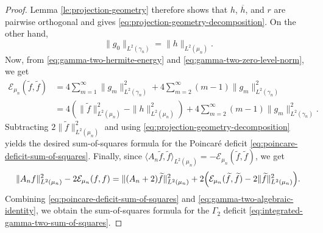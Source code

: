 \documentclass[11pt,reqno]{amsart}
\numberwithin{equation}{section}%
\numberwithin{figure}{section}%
\numberwithin{table}{section}
\theoremstyle{plain}
\theoremstyle{definition}
\begin{document}
\begin{proof}
  Lemma \ref{le:projection-geometry} therefore shows that $h$, $\overline h$,
  and $r$ are pairwise orthogonal and gives
  \eqref{eq:projection-geometry-decomposition}. On the other hand, 
  \begin{equation}\label{eq:gamma-two-zero-level-norm}
    \|g_0\|_{L^2(\gamma_n)}=\|h\|_{L^2(\mu_n)}.
  \end{equation}
  Now, from \eqref{eq:gamma-two-hermite-energy} and
  \eqref{eq:gamma-two-zero-level-norm}, we get
  \begin{align*}
    \mathcal{E}_{\mu_n}(\widetilde f,\widetilde f)
    &=4\sum_{m=1}^{\infty}\|g_m\|_{L^2(\gamma_n)}^2
      +4\sum_{m=2}^{\infty}(m-1)\|g_m\|_{L^2(\gamma_n)}^2\\
    &=4\left(
      \|\widetilde f\|_{L^2(\mu_n)}^2
      -\|h\|_{L^2(\mu_n)}^2
      \right)
      +4\sum_{m=2}^{\infty}(m-1)\|g_m\|_{L^2(\gamma_n)}^2.
  \end{align*}
  Subtracting $2\|\widetilde f\|_{L^2(\mu_n)}^2$ and using
  \eqref{eq:projection-geometry-decomposition} yields the desired sum-of-squares
  formula for the Poincaré deficit \eqref{eq:poincare-deficit-sum-of-squares}.
  Finally, since
  $\langle A_n\widetilde f,\widetilde
  f\rangle_{L^2(\mu_n)}=-\mathcal{E}_{\mu_n}(\widetilde f,\widetilde f)$, we
  get
  \begin{equation}\label{eq:gamma-two-algebraic-identity}
    \|A_nf\|_{L^2(\mu_n)}^2
    -2\mathcal{E}_{\mu_n}(f,f)
    =
    \|(A_n+2)\widetilde f\|_{L^2(\mu_n)}^2
    +2\Bigl(
      \mathcal{E}_{\mu_n}(\widetilde f,\widetilde f)
      -2\|\widetilde f\|_{L^2(\mu_n)}^2
    \Bigr).
  \end{equation}
  Combining \eqref{eq:poincare-deficit-sum-of-squares} and
  \eqref{eq:gamma-two-algebraic-identity}, we obtain the sum-of-squares
  formula for the $\Gamma_2$ deficit
  \eqref{eq:integrated-gamma-two-sum-of-squares}.
\end{proof}
\end{document}
